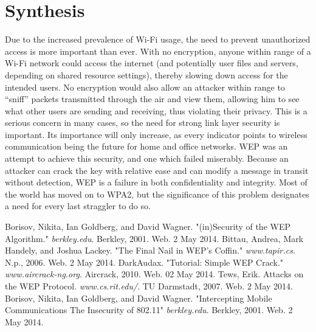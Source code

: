\documentclass[12pt]{article}
\begin{document}
\newpage
\section{Synthesis}
\label{sec:synth}
Due to the increased prevalence of Wi-Fi usage, the need to prevent unauthorized access is more important than ever.  With no encryption, anyone within range of a Wi-Fi network could access the internet (and potentially user files and servers, depending on shared resource settings), thereby slowing down access for the intended users.  No encryption would also allow an attacker within range to “sniff” packets transmitted through the air and view them, allowing him to see what other users are sending and receiving, thus violating their privacy.  This is a serious concern in many cases, so the need for strong link layer security is important.  Its importance will only increase, as every indicator points to wireless communication being the future for home and office networks.  WEP was an attempt to achieve this security, and one which failed miserably.  Because an attacker can crack the key with relative ease and can modify a message in transit without detection, WEP is a failure in both confidentiality and integrity.  Most of the world has moved on to WPA2, but the significance of this problem designates a need for every last straggler to do so.

\newpage
\begin{thebibliography}{1}
\bibitem{} Borisov, Nikita, Ian Goldberg, and David Wagner. "(in)Security of the WEP Algorithm." \textit{berkley.edu}. Berkley, 2001. Web. 2 May 2014.
\bibitem{} Bittau, Andrea, Mark Handely, and Joshua Lackey. "The Final Nail in WEP's Coffin." \textit{www.tapir.cs.} N.p., 2006. Web. 2 May 2014.
\bibitem{} DarkAudax. "Tutorial: Simple WEP Crack." \textit{www.aircrack-ng.org}. Aircrack, 2010. Web. 02 May 2014.
\bibitem{} Tews, Erik. Attacks on the WEP Protocol. \textit{www.cs.rit.edu/}. TU Darmstadt, 2007. Web. 2 May 2014.
\bibitem{} Borisov, Nikita, Ian Goldberg, and David Wagner. "Intercepting Mobile Communications\:
The Insecurity of 802.11" \textit{berkley.edu}. Berkley, 2001. Web. 2 May 2014.

\end{thebibliography}
\end{document}
